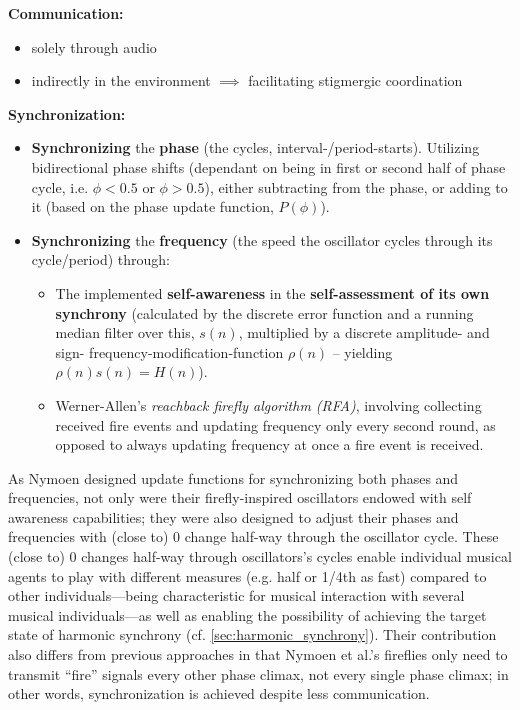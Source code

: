 \textbf{Communication:}
\begin{itemize}
    \item solely through audio
    \item indirectly in the environment $\implies$ facilitating stigmergic coordination
\end{itemize}

\textbf{Synchronization:}
\begin{itemize}
    \item \textbf{Synchronizing} the \textbf{phase} (the cycles, interval-/period-starts). Utilizing bidirectional phase shifts (dependant on being in first or second half of phase cycle, i.e. $\phi < 0.5$ or $\phi > 0.5$), either subtracting from the phase, or adding to it (based on the phase update function, $P(\phi)$).
    \item \textbf{Synchronizing} the \textbf{frequency} (the speed the oscillator cycles through its cycle/period) through:
    \begin{itemize}
        \item The implemented \textbf{self-awareness} in the \textbf{self-assessment of its own synchrony} (calculated by the discrete error function and a running median filter over this, $s(n)$, multiplied by a discrete amplitude- and sign- frequency-modification-function $\rho(n)$ -- yielding $\rho(n)s(n) = H(n)$).
        \item Werner-Allen's \textit{reachback firefly algorithm (RFA)}, involving collecting received fire events and updating frequency only every second round, as opposed to always updating frequency at once a fire event is received.
    \end{itemize}
\end{itemize}

As Nymoen designed update functions for synchronizing both phases and frequencies, not only were their firefly-inspired oscillators endowed with self awareness capabilities; they were also designed to adjust their phases and frequencies with (close to) 0 change half-way through the oscillator cycle. These (close to) 0 changes half-way through oscillators's cycles enable individual musical agents to play with different measures (e.g. half or 1/4th as fast) compared to other individuals—being characteristic for musical interaction with several musical individuals—as well as enabling the possibility of achieving the target state of harmonic synchrony (cf. \ref{sec:harmonic_synchrony}). Their contribution also differs from previous approaches in that Nymoen et al.'s fireflies only need to transmit ``fire'' signals every other phase climax, not every single phase climax; in other words, synchronization is achieved despite less communication.

